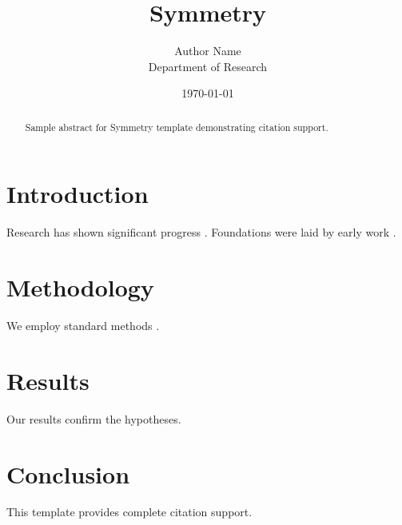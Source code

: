 \documentclass{mdpi}
\title{Symmetry}
\author{Author Name \\ \small Department of Research}
\date{\today}
\begin{document}
\maketitle

\begin{abstract}
Sample abstract for Symmetry template demonstrating citation support.
\end{abstract}

\section{Introduction}
Research has shown significant progress \citep{einstein1905}. Foundations were laid by early work \citep{turing1950}.

\section{Methodology}
We employ standard methods \citep{knuth1984}.

\section{Results}
Our results confirm the hypotheses.

\section{Conclusion}
This template provides complete citation support.



\end{document}
